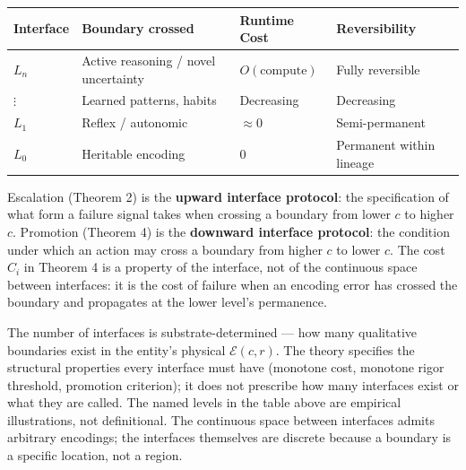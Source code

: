 \documentclass[
]{article}
\newcounter{none} %
\begin{document}
{\def\LTcaptype{none} %
\begin{longtable}[]{@{}
  >{\raggedright\arraybackslash}p{}
  >{\raggedright\arraybackslash}p{}
  >{\raggedright\arraybackslash}p{}
  >{\raggedright\arraybackslash}p{}@{}}
\toprule\noalign{}
\begin{minipage}[b]{\linewidth}\raggedright
Interface
\end{minipage} & \begin{minipage}[b]{\linewidth}\raggedright
Boundary crossed
\end{minipage} & \begin{minipage}[b]{\linewidth}\raggedright
Runtime Cost
\end{minipage} & \begin{minipage}[b]{\linewidth}\raggedright
Reversibility
\end{minipage} \\
\midrule\noalign{}
\endhead
\bottomrule\noalign{}
\endlastfoot
\(L_n\) & Active reasoning / novel uncertainty & \(O(\text{compute})\) &
Fully reversible \\
\(\vdots\) & Learned patterns, habits & Decreasing & Decreasing \\
\(L_1\) & Reflex / autonomic & \(\approx 0\) & Semi-permanent \\
\(L_0\) & Heritable encoding & \(0\) & Permanent within lineage \\
\end{longtable}
}

Escalation (Theorem 2) is the \textbf{upward interface protocol}: the
specification of what form a failure signal takes when crossing a
boundary from lower \(c\) to higher \(c\). Promotion (Theorem 4) is the
\textbf{downward interface protocol}: the condition under which an
action may cross a boundary from higher \(c\) to lower \(c\). The cost
\(C_i\) in Theorem 4 is a property of the interface, not of the
continuous space between interfaces: it is the cost of failure when an
encoding error has crossed the boundary and propagates at the lower
level's permanence.

The number of interfaces is substrate-determined --- how many
qualitative boundaries exist in the entity's physical
\(\mathcal{E}(c, r)\). The theory specifies the structural properties
every interface must have (monotone cost, monotone rigor threshold,
promotion criterion); it does not prescribe how many interfaces exist or
what they are called. The named levels in the table above are empirical
illustrations, not definitional. The continuous space between interfaces
admits arbitrary encodings; the interfaces themselves are discrete
because a boundary is a specific location, not a region.
\end{document}
